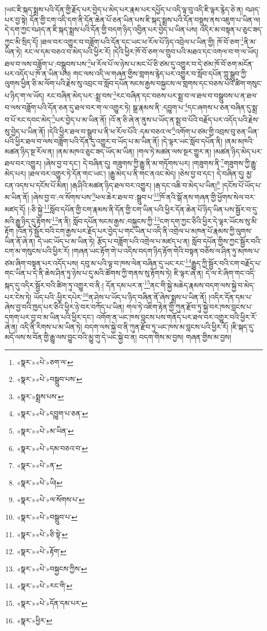 །ཡང་ཇི་སྐད་སྨྲས་པའི་དོན་གྱི་རྗོད་པར་བྱེད་པ་མེད་པར་རྣམ་པར་དཔྱོད་པ་འདི་ལྟ་བུ་འདི་ཇི་ལྟར་རྙེད་ཅེ་ན། བཤད་པར་བྱ་སྟེ། དོན་གྱི་ངག་འདི་དག་ནི་དོན་ཆེན་པོ་ཅན་ཡིན་པས་ཇི་སྐད་སྨྲས་པའི་དོན་བསྡུས་ནས་འཇུག་པ་ཡིན་ལ། དེ་དག་ཀྱང་བཤད་ན་ཇི་སྐད་སྨྲས་པའི་དོན་གྱི་བདག་ཉིད་འབྱིན་པར་བྱེད་པ་ཡིན་པས། འདིར་མ་བསྟན་པ་ཅུང་ཟད་ཀྱང་མི་སྲིད་དོ། །ཐལ་བར་འགྱུར་བ་བཟློག་པའི་དོན་དང་ཡང་ཕ་རོལ་པོ་ཉིད་འབྲེལ་པ་ཡིན་གྱི། ཁོ་བོ་ཅག་\footnote{«སྣར་»«པེ་»ཅག་ལ་}ནི་མ་ཡིན་ཏེ། རང་ལ་དམ་བཅའ་བ་མེད་པའི་ཕྱིར་རོ། །དེའི་ཕྱིར་ཁོ་བོ་ཅག་ལ་གྲུབ་པའི་མཐའ་དང་འགལ་བ་ག་ལ་ཡོད། ཐལ་བ་ལས་བཟློག་པ་:བསྒྲུབས་པས་\footnote{«སྣར་»«པེ་»བསྒྲུབ་པས་}ཕ་རོལ་པོ་ལ་ཉེས་པ་མང་པོ་ཅི་ཙམ་དུ་འགྱུར་བ་དེ་ཙམ་ཁོ་བོ་ཅག་མངོན་པར་འདོད་པ་ཁོ་ན་ཡིན་པས། གང་ལས་འདི་ལ་གཞན་གྱིས་གླགས་རྙེད་པར་འགྱུར་བ་སློབ་དཔོན་ཀླུ་སྒྲུབ་ཀྱི་ལུགས་ཕྱིན་ཅི་མ་ལོག་པའི་རྗེས་སུ་འབྲང་བ་སློབ་དཔོན་སངས་རྒྱས་བསྐྱངས་ལ་གླགས་དང་བཅས་པའི་ཚིག་གསུང་པ་ཉིད་ག་ལ་ཡོད། རང་བཞིན་མེད་པར་:སྨྲ་བས་\footnote{«སྣར་»སྨྲས་པས་}རང་བཞིན་དང་བཅས་པར་སྨྲ་བ་ལ་ཐལ་བ་བསྒྲུབས་པ་ན་ཐལ་བ་ལས་བཟློག་པའི་དོན་ཅན་དུ་ཐལ་བར་ག་ལ་འགྱུར་ཏེ། སྒྲ་རྣམས་ནི་:དབྱུག་པ་\footnote{«སྣར་»«པེ་»དབྱུག་པ་ཅན་}དང་ཞགས་པ་ཅན་བཞིན་དུ་སྨྲ་བ་པོ་རང་དབང་མེད་\footnote{«སྣར་»«པེ་»མ་ཡིན་}པར་བྱེད་པ་མ་ཡིན་ནོ། །འོ་ན་ཅི་ཞེ་ན་ནུས་པ་ཡོད་ན་སྨྲ་བ་པོའི་བརྗོད་པར་འདོད་པའི་རྗེས་སུ་བྱེད་པ་ཡིན་ནོ། །དེའི་ཕྱིར་ཐལ་བ་སྒྲུབ་པ་ནི་ཕ་རོལ་པོའི་:དམ་བཅའ་ལ་\footnote{«སྣར་»«པེ་»དམ་བཅའ་བ་}འགོག་པ་ཙམ་གྱི་འབྲས་བུ་ཅན་ཡིན་པའི་ཕྱིར་ཐལ་བ་ལས་བཟློག་པའི་དོན་དུ་འགྱུར་བ་ཡོད་པ་མ་ཡིན་ནོ། །དེ་ལྟར་ཡང་སློབ་དཔོན་ནི། །ནམ་མཁའི་མཚན་ཉིད་སྔ་རོལ་ན། །ནམ་མཁའ་ཅུང་ཟད་ཡོད་མ་ཡིན། །གལ་ཏེ་མཚན་ལས་སྔར་གྱུར་ན། །མཚན་ཉིད་མེད་པར་ཐལ་བར་འགྱུར། །ཞེས་བྱ་བ་དང་། དེ་བཞིན་དུ། གཟུགས་ཀྱི་རྒྱུ་ནི་མ་གཏོགས་པར། །གཟུགས་ནི་\footnote{«སྣར་»«པེ་»ན་}གཟུགས་ཀྱི་རྒྱུ་མེད་པར། །ཐལ་བར་འགྱུར་ཏེ་དོན་གང་ཡང་། །རྒྱུ་མེད་པ་ནི་གང་ནའང་མེད། །ཅེས་བྱ་བ་དང་། དེ་བཞིན་དུ། མྱ་ངན་འདས་པ་དངོས་པོ་མིན། །རྒ་ཤིའི་མཚན་ཉིད་ཐལ་བར་འགྱུར། །རྒ་དང་འཆི་བ་མེད་པ་ཡིན།\footnote{«སྣར་»«པེ་»ཡི།} །དངོས་པོ་ཡོད་པ་མ་ཡིན་ནོ། །ཞེས་བྱ་བ་:ལ་སོགས་པས་\footnote{«སྣར་»«པེ་»ལ་སོགས་པ་}ཕལ་ཆེར་ཐལ་བ་:སྒྲུབ་པ་\footnote{«སྣར་»«པེ་»བསྒྲུབ་པ་}ཁོ་ནའི་སྒོ་ནས་གཞན་གྱི་ཕྱོགས་སེལ་བར་མཛད་དོ། །:ཅི་སྐྱེ་\footnote{«སྣར་»«པེ་»ཅི་སྟེ་}སློབ་དཔོན་གྱི་ངག་རྣམས་ནི་དོན་གྱི་ངག་ཡིན་པའི་ཕྱིར་དོན་ཆེན་པོ་ཉིད་ཡིན་པས་སྦྱོར་བ་དུ་མའི་རྒྱུ་ཉིད་དུ་རྟོགས་\footnote{«སྣར་»«པེ་»རྟོག་}ན་ནི། སློབ་དཔོན་སངས་རྒྱས་:བསྐྱངས་ཀྱི་\footnote{«སྣར་»«པེ་»བསྐྱངས་ཀྱིས་}ངག་དག་ཀྱང་ཅིའི་ཕྱིར་དེ་ལྟར་ཡོངས་སུ་མི་རྟོག །འོན་ཏེ་སྦྱོར་བའི་ངག་རྒྱས་པར་རྗོད་པར་བྱེད་པ་གང་ཡིན་པ་འདི་ནི་འགྲེལ་པ་མཁན་པོ་རྣམས་ཀྱི་ལུགས་ཡིན་ནོ་ཞེ་ན། དེ་ཡང་ཡོད་པ་མ་ཡིན་ཏེ། རྩོད་པ་བཟློག་པའི་འགྲེལ་པ་མཛད་པ་ན། སློབ་དཔོན་གྱིས་ཀྱང་སྦྱོར་བའི་ངག་མ་གསུངས་པའི་ཕྱིར་རོ། །གཞན་ཡང་རྟོག་གེ་པ་འདིས་བདག་ཉིད་རྟོག་གེའི་བསྟན་བཅོས་ལ་ཤིན་ཏུ་མཁས་པ་ཙམ་ཞིག་བསྟན་པར་འདོད་པས། དབུ་མ་པའི་ལྟ་བ་ཁས་ལེན་བཞིན་དུ་ཡང་རང་\footnote{«སྣར་»«པེ་»རང་གི་}རྒྱུད་ཀྱི་སྦྱོར་བའི་ངག་བརྗོད་པ་གང་ཡིན་པ་དེ་ནི་ཆེས་ཤིན་ཏུ་ཉེས་པ་དུ་མའི་ཚོགས་ཀྱི་གནས་སུ་རྟོགས་ཏེ། ཇི་ལྟར་ཞེ་ན། དེ་ལ་རེ་ཞིག་གང་འདི་སྐད་དུ་འདིར་སྦྱོར་བའི་ཚིག་ཏུ་འགྱུར་བ་ནི:། དོན་དམ་པར་ན་\footnote{«སྣར་»«པེ་»དོན་དམ་པར་}ནང་གི་སྐྱེ་མཆེད་རྣམས་བདག་ལས་སྐྱེ་བ་མེད་པར་ངེས་ཏེ། ཡོད་པའི་:ཕྱིར་དཔེར་\footnote{«སྣར་»ཕྱིར་}ན་ཤེས་པ་ཡོད་པ་ཉིད་བཞིན་ནོ་ཞེས་སྨྲས་པ་ཡིན་ནོ། །འདིར་དོན་དམ་པ་ཞེས་བྱ་བའི་ཁྱད་པར་ཅིའི་ཕྱིར་ཉེ་བར་བཀོད་པ་ཡིན། གལ་ཏེ་འཇིག་རྟེན་གྱི་ཀུན་རྫོབ་ཏུ་སྐྱེ་བར་ཁས་བླངས་པ་དགག་པར་བྱ་བ་མ་ཡིན་པའི་ཕྱིར་དང་། འགོག་ན་ཡང་ཁས་བླངས་པས་གནོད་པར་ཐལ་བར་འགྱུར་བའི་ཕྱིར་རོ་ཞེ་ན། འདི་ནི་རིགས་པ་མ་ཡིན་ཏེ། བདག་ལས་སྐྱེ་བ་ནི་ཀུན་རྫོབ་ཏུ་ཡང་ཁས་མ་བླངས་པའི་ཕྱིར་རོ། །ཇི་སྐད་དུ་མདོ་ལས་ས་བོན་གྱི་རྒྱུ་ལས་བྱུང་བའི་མྱུ་གུ་དེ་ཡང་སྐྱེ་བ་ན། བདག་གིས་མ་བྱས། གཞན་གྱིས་མ་བྱས། 
